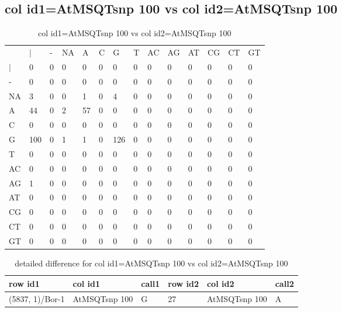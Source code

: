 \subsection{col id1=AtMSQTsnp 100 vs col id2=AtMSQTsnp 100}
\begin{center}
\begin{longtable}{|l|l|l|l|l|l|l|l|l|l|l|l|l|l|}
\caption{col id1=AtMSQTsnp 100 vs col id2=AtMSQTsnp 100} \label{table_dm684}\\
\hline
\\
\hline
&$|$&-&NA&A&C&G&T&AC&AG&AT&CG&CT&GT\\
$|$&0&0&0&0&0&0&0&0&0&0&0&0&0\\
-&0&0&0&0&0&0&0&0&0&0&0&0&0\\
NA&3&0&0&1&0&4&0&0&0&0&0&0&0\\
A&44&0&2&57&0&0&0&0&0&0&0&0&0\\
C&0&0&0&0&0&0&0&0&0&0&0&0&0\\
G&100&0&1&1&0&126&0&0&0&0&0&0&0\\
T&0&0&0&0&0&0&0&0&0&0&0&0&0\\
AC&0&0&0&0&0&0&0&0&0&0&0&0&0\\
AG&1&0&0&0&0&0&0&0&0&0&0&0&0\\
AT&0&0&0&0&0&0&0&0&0&0&0&0&0\\
CG&0&0&0&0&0&0&0&0&0&0&0&0&0\\
CT&0&0&0&0&0&0&0&0&0&0&0&0&0\\
GT&0&0&0&0&0&0&0&0&0&0&0&0&0\\
\hline
\end{longtable}
\end{center}

\begin{center}
\begin{longtable}{|l|l|l|l|l|l|}
\caption{detailed difference for col id1=AtMSQTsnp 100 vs col id2=AtMSQTsnp 100} \label{table_dm685}\\
\hline
row id1&col id1&call1&row id2&col id2&call2\\
\hline
(5837, 1)/Bor-1&AtMSQTsnp 100&G&27&AtMSQTsnp 100&A\\
\hline
\end{longtable}
\end{center}

